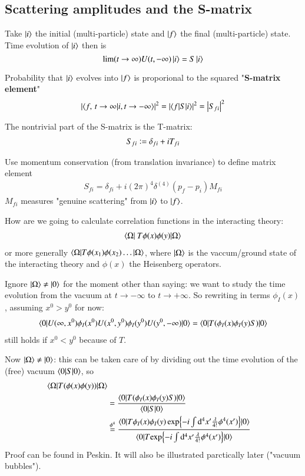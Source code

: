 \subsection{Scattering amplitudes and the S-matrix}
Take $\ket{i}$ the initial (multi-particle) state and $\ket{f}$ the final (multi-particle) state. Time evolution of $\ket{i}$ then is
$$\lim(t\rightarrow\infty)U(t,-\infty) \ket{i} = S \ket{i}$$

Probability that $\ket{i}$ evolves into $\ket{f}$ is proporional to the squared "\textbf{S-matrix element}"
\begin{align}
	\left|	\braket{f,\, t\to \infty | i, t\rightarrow - \infty}\right|^2 = \left| \braket{f|S|i} \right|^2 = \left| S_{fi} \right|^2
\end{align}

The nontrivial part of the S-matrix is the T-matrix:
\begin{align}
	S_{fi} \vcentcolon = \delta_{fi} + iT_{fi}
\end{align}

Use momentum conservation (from translation invariance) to define matrix element
\begin{align}
	S_{fi} = \delta_{fi} + i(2\pi)^4 \delta^{(4)}(p_f - p_i) M_{fi}
\end{align}
$M_{fi}$ measures "genuine scattering" from $\ket{i}$ to $\ket{f}$.

How are we going to calculate correlation functions in the interacting theory:
\begin{align}
	\braket{\Omega |  \ T \phi(x)\phi(y) | \Omega}	
\end{align}
or more generally $\braket{\Omega | T \phi(x_1)\phi(x_2)\dots | \Omega}$, where $\ket{\Omega}$ is the vaccum/ground state of the interacting theory and $\phi(x)$ the Heisenberg operators.

Ignore $\ket{\Omega} \neq \ket{0}$ for the moment other than saying: we want to study the time evolution from the vacuum at $t\rightarrow - \infty$ to $t \rightarrow + \infty$. So rewriting in terms $\phi_I(x)$, assuming $x^0 > y^0$ for now:
\begin{align}
	\braket{0 | U(\infty, x^0) \phi_I(x^0)  U(x^0, y^0) \phi_I(y^0)U(y^0, -\infty) | 0}  = \braket{0|T(\phi_I(x)\phi_I(y)S)|0}
\end{align}
still holds if $x^0 < y^0$ because of $T$.

Now $\ket{\Omega} \neq \ket{0}$: this can be taken care of by dividing out the time evolution of the (free) vacuum $\braket{0|S|0}$, so
\begin{align}
	\braket{\Omega | T(\phi(x)\phi(y))|\Omega} \notag\\
	&= \frac{\braket{0 | T(\phi_I(x)\phi_I(y)S)|0}}{\braket{0|S|0}} \\
	&\stackrel{\phi^4}{=} \frac{
		\braket{0 | T {\phi_I(x)\phi_I(y)\exp{-i\int\dd^4x' \frac{\lambda}{4!}\phi^4(x')}}| 0}
		}{
		\braket{0 | T {\exp{-i\int\dd^4x' \frac{\lambda}{4!}\phi^4(x')}}| 0}
}\notag
\end{align}
Proof can be found in Peskin. It will also be illustrated parctically later ("vacuum bubbles").

